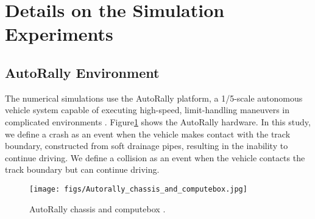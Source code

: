 \section{Details on the Simulation Experiments}\label{app:sim_details} 

\subsection{AutoRally Environment} \label{app:sim_details:autorally}
The numerical simulations use the AutoRally platform, a 1/5-scale autonomous vehicle system capable of executing high-speed, limit-handling maneuvers in complicated environments \cite{goldfain2019autorally}.
Figure\ref{fig:AutorallyChassisAndComputeBox} shows the AutoRally hardware.
In this study, we define a crash as an event when the vehicle makes contact with the track boundary, constructed from soft drainage pipes, resulting in the inability to continue driving. We define a collision as an event when the vehicle contacts the track boundary but can continue driving.

\begin{figure}[htb]
    \centering
    \centerline{\texttt{[image: figs/Autorally\_chassis\_and\_computebox.jpg]}}
    \caption{AutoRally chassis and computebox \cite{AutorallyHardware}.}
    \label{fig:AutorallyChassisAndComputeBox}
\end{figure}